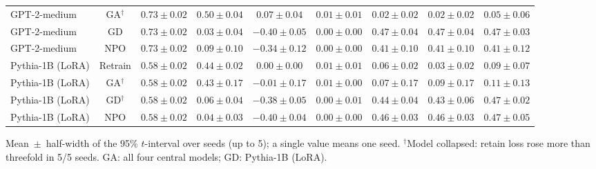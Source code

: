 \begin{table}[t]
\begin{tabular*}{\textwidth}{@{\extracolsep{\fill}}lcccccccc@{}}
GPT-2-medium & GA$^{\dagger}$ & $0.73 \pm 0.02$ & $0.50 \pm 0.04$ & $0.07 \pm 0.04$ & $0.01 \pm 0.01$ & $0.02 \pm 0.02$ & $0.02 \pm 0.02$ & $0.05 \pm 0.06$ \\
GPT-2-medium & GD & $0.73 \pm 0.02$ & $0.03 \pm 0.04$ & $-0.40 \pm 0.05$ & $0.00 \pm 0.00$ & $0.47 \pm 0.04$ & $0.47 \pm 0.04$ & $0.47 \pm 0.03$ \\
GPT-2-medium & NPO & $0.73 \pm 0.02$ & $0.09 \pm 0.10$ & $-0.34 \pm 0.12$ & $0.00 \pm 0.00$ & $0.41 \pm 0.10$ & $0.41 \pm 0.10$ & $0.41 \pm 0.12$ \\
Pythia-1B (LoRA) & Retrain & $0.58 \pm 0.02$ & $0.44 \pm 0.02$ & $0.00 \pm 0.00$ & $0.01 \pm 0.01$ & $0.06 \pm 0.02$ & $0.03 \pm 0.02$ & $0.09 \pm 0.07$ \\
Pythia-1B (LoRA) & GA$^{\dagger}$ & $0.58 \pm 0.02$ & $0.43 \pm 0.17$ & $-0.01 \pm 0.17$ & $0.01 \pm 0.00$ & $0.07 \pm 0.17$ & $0.09 \pm 0.17$ & $0.11 \pm 0.13$ \\
Pythia-1B (LoRA) & GD$^{\dagger}$ & $0.58 \pm 0.02$ & $0.06 \pm 0.04$ & $-0.38 \pm 0.05$ & $0.00 \pm 0.01$ & $0.44 \pm 0.04$ & $0.43 \pm 0.06$ & $0.47 \pm 0.02$ \\
Pythia-1B (LoRA) & NPO & $0.58 \pm 0.02$ & $0.04 \pm 0.03$ & $-0.40 \pm 0.04$ & $0.00 \pm 0.00$ & $0.46 \pm 0.03$ & $0.46 \pm 0.03$ & $0.47 \pm 0.05$ \\
\bottomrule
\end{tabular*}

\smallskip
{\footnotesize Mean~$\pm$~half-width of the 95\% $t$-interval over seeds (up to 5); a single value means one seed. $^{\dagger}$Model collapsed: retain loss rose more than threefold in 5/5 seeds. GA: all four central models; GD: Pythia-1B (LoRA).\par}
\end{table}

